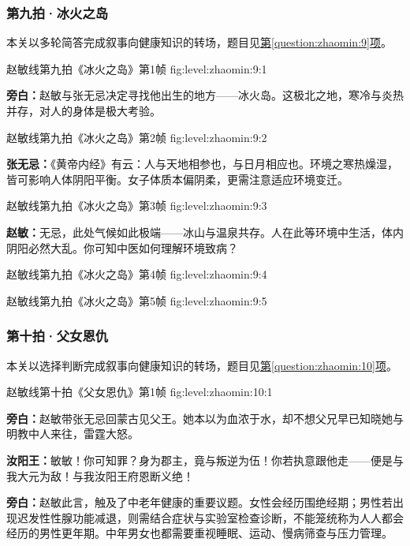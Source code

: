 \subsubsection{第九拍·冰火之岛}\label{plot:zhaomin:9}
本关以多轮简答完成叙事向健康知识的转场，题目见\hyperref[question:zhaomin:9]{第\ref*{question:zhaomin:9}项}。

  {赵敏线第九拍《冰火之岛》第1帧}
  {fig:level:zhaomin:9:1}
  {\scriptsize}
  {\textbf{旁白：}赵敏与张无忌决定寻找他出生的地方——冰火岛。这极北之地，寒冷与炎热并存，对人的身体是极大考验。\par}

  {赵敏线第九拍《冰火之岛》第2帧}
  {fig:level:zhaomin:9:2}
  {\scriptsize}
  {\textbf{张无忌：}《黄帝内经》有云：人与天地相参也，与日月相应也。环境之寒热燥湿，皆可影响人体阴阳平衡。女子体质本偏阴柔，更需注意适应环境变迁。\par}

\clearpage

  {赵敏线第九拍《冰火之岛》第3帧}
  {fig:level:zhaomin:9:3}
  {\scriptsize}
  {\textbf{赵敏：}无忌，此处气候如此极端——冰山与温泉共存。人在此等环境中生活，体内阴阳必然大乱。你可知中医如何理解环境致病？\par}

  {赵敏线第九拍《冰火之岛》第4帧}
  {fig:level:zhaomin:9:4}
  {\scriptsize}
  {\mbox{}}

  {赵敏线第九拍《冰火之岛》第5帧}
  {fig:level:zhaomin:9:5}
  {\scriptsize}
  {\mbox{}}

\clearpage

\subsubsection{第十拍·父女恩仇}\label{plot:zhaomin:10}
本关以选择判断完成叙事向健康知识的转场，题目见\hyperref[question:zhaomin:10]{第\ref*{question:zhaomin:10}项}。

  {赵敏线第十拍《父女恩仇》第1帧}
  {fig:level:zhaomin:10:1}
  {\tiny}
  {\textbf{旁白：}赵敏带张无忌回蒙古见父王。她本以为血浓于水，却不想父兄早已知晓她与明教中人来往，雷霆大怒。\par
\textbf{汝阳王：}敏敏！你可知罪？身为郡主，竟与叛逆为伍！你若执意跟他走——便是与我大元为敌！与我汝阳王府恩断义绝！\par
\textbf{旁白：}赵敏此言，触及了中老年健康的重要议题。女性会经历围绝经期；男性若出现迟发性性腺功能减退，则需结合症状与实验室检查诊断，不能笼统称为人人都会经历的男性更年期。中年男女也都需要重视睡眠、运动、慢病筛查与压力管理。\par}

